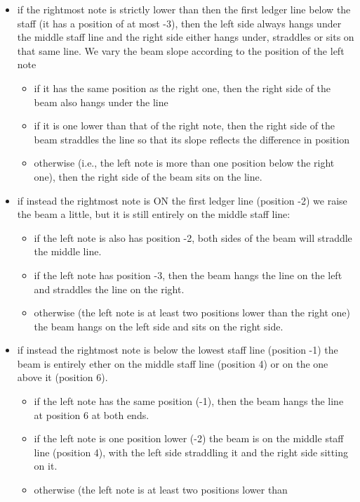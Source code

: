 \begin{itemize}
\item if the rightmost note is strictly lower than then the first
  ledger line below the staff (it has a position of at most -3), then
  the left side always hangs under the middle staff line and the right
  side either hangs under, straddles or sits on that same line.  We vary the
  beam slope according to the position of the left note
  \begin{itemize} 
  \item if it has the same position as the right one, then the right
    side of the beam also hangs under the line
  \item if it is one lower than that of the right note, then the right
    side of the beam straddles the line so that its slope reflects the
    difference in position
  \item otherwise (i.e., the left note is more than one position
    below the right one), then the right side of the beam sits on the
    line. 
  \end{itemize}
\item if instead the rightmost note is ON the first ledger line
  (position -2) we raise the beam a little, but it is still entirely
  on the middle staff line:
  \begin{itemize}
  \item if the left note is also has position -2, both sides of the
    beam will straddle the middle line.
  \item if the left note has position -3, then the beam hangs the line
    on the left and straddles the line on the right.
  \item otherwise (the left note is at least two positions lower than
    the right one) the beam hangs on the left side and sits on the
    right side. 
  \end{itemize}
\item if instead the rightmost note is below the lowest staff line
  (position -1) the beam is entirely ether on the middle staff line
  (position 4) or on the one above it (position 6). 
  \begin{itemize}
  \item if the left note has the same position (-1), then the beam
    hangs the line at position 6 at both ends. 
  \item if the left note is one position lower (-2) the beam is on the
    middle staff line (position 4), with the left side straddling it and
    the right side sitting on it. 
  \item otherwise (the left note is at least two positions lower than

\end{itemize}
\end{itemize}
